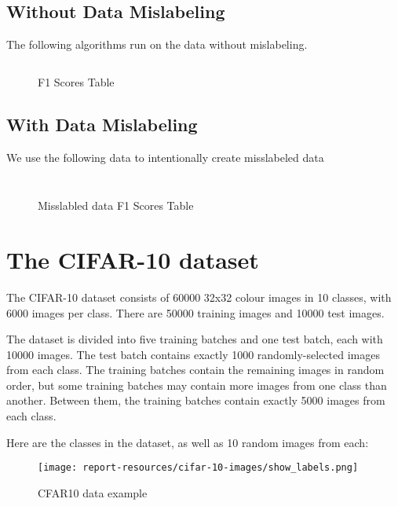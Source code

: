 \documentclass{article}
\begin{document}
\subsection{Without Data Mislabeling}

The following algorithms run on the data without mislabeling. 

\inputminted[firstline=30,lastline=77,frame=single,framesep=10pt]{python}{minst/main.py}

\begin{figure}[H]
    \centering
    
    \caption{F1 Scores Table}
\end{figure}


\subsection{With Data Mislabeling}

We use the following data to intentionally create misslabeled data

\inputminted[frame=single,framesep=10pt]{python}{minst/do_miss_label.py}


\inputminted[firstline=93,lastline=142,frame=single,framesep=10pt]{python}{minst/main.py}


\begin{figure}[H]
    \centering
    
    \caption{Misslabled data F1 Scores Table}
\end{figure}

\section{The CIFAR-10 dataset}
The CIFAR-10 dataset consists of 60000 32x32 colour images in 10 classes, with 6000 images per class. There are 50000 training images and 10000 test images.

The dataset is divided into five training batches and one test batch, each with 10000 images. The test batch contains exactly 1000 randomly-selected images from each class. The training batches contain the remaining images in random order, but some training batches may contain more images from one class than another. Between them, the training batches contain exactly 5000 images from each class.

Here are the classes in the dataset, as well as 10 random images from each:

\begin{figure}[H]
    \centering
    \texttt{[image: report-resources/cifar-10-images/show\_labels.png]}
    \caption{CFAR10 data example}
\end{figure}
\end{document}
